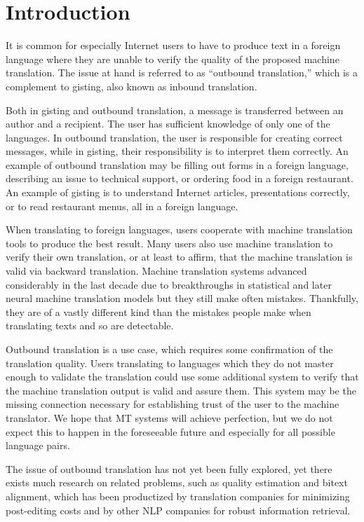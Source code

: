\chapter*{Introduction}

It is common for especially Internet users to have to produce text in a foreign language where they are unable to verify the quality of the proposed machine translation. The issue at hand is referred to as ``outbound translation,'' which is a complement to gisting, also known as inbound translation.

Both in gisting and outbound translation, a message is transferred between an author and a recipient. The user has sufficient knowledge of only one of the languages. In outbound translation, the user is responsible for creating correct messages, while in gisting, their responsibility is to interpret them correctly. An example of outbound translation may be filling out forms in a foreign language, describing an issue to technical support, or ordering food in a foreign restaurant. An example of gisting is to understand Internet articles, presentations correctly, or to read restaurant menus, all in a foreign language.

When translating to foreign languages, users cooperate with machine translation tools to produce the best result. Many users also use machine translation to verify their own translation, or at least to affirm, that the machine translation is valid via backward translation. Machine translation systems advanced considerably in the last decade due to breakthroughs in statistical and later neural machine translation models but they still make often mistakes. Thankfully, they are of a vastly different kind than the mistakes people make when translating texts and so are detectable.

Outbound translation is a use case, which requires some confirmation of the translation quality. Users translating to languages which they do not master enough to validate the translation could use some additional system to verify that the machine translation output is valid and assure them. This system may be the missing connection necessary for establishing trust of the user to the machine translator. We hope that MT systems will achieve perfection, but we do not expect this to happen in the foreseeable future and especially for all possible language pairs.

The issue of outbound translation has not yet been fully explored, yet there exists much research on related problems, such as quality estimation and bitext alignment, which has been productized by translation companies for minimizing post-editing costs and by other NLP companies for robust information retrieval.

